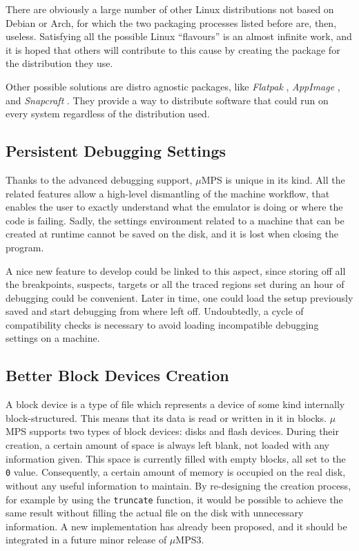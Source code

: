 \documentclass[12pt,a4paper,openright,twoside]{report}
\begin{document}
There are obviously a large number of other Linux distributions not based on Debian or Arch, for which the two packaging processes listed before are, then, useless.
Satisfying all the possible Linux ``flavours'' is an almost infinite work, and it is hoped that others will contribute to this cause by creating the package for the distribution they use.

Other possible solutions are distro agnostic packages, like \textit{Flatpak} \cite{flatpak}, \textit{AppImage} \cite{appimage}, and \textit{Snapcraft} \cite{snapcraft}.
They provide a way to distribute software that could run on every system regardless of the distribution used.

\subsection{Persistent Debugging Settings}
Thanks to the advanced debugging support, $\mu$MPS is unique in its kind.
All the related features allow a high-level dismantling of the machine workflow, that enables the user to exactly understand what the emulator is doing or where the code is failing.
Sadly, the settings environment related to a machine that can be created at runtime cannot be saved on the disk, and it is lost when closing the program.

A nice new feature to develop could be linked to this aspect, since storing off all the breakpoints, suspects, targets or all the traced regions set during an hour of debugging could be convenient.
Later in time, one could load the setup previously saved and start debugging from where left off.
Undoubtedly, a cycle of compatibility checks is necessary to avoid loading incompatible debugging settings on a machine.

\subsection{Better Block Devices Creation}
A block device is a type of file which represents a device of some kind internally block-structured.
This means that its data is read or written in it in blocks.
$\mu$MPS supports two types of block devices: disks and flash devices.
During their creation, a certain amount of space is always left blank, not loaded with any information given.
This space is currently filled with empty blocks, all set to the \texttt{0} value.
Consequently, a certain amount of memory is occupied on the real disk, without any useful information to maintain.
By re-designing the creation process, for example by using the \texttt{truncate} function, it would be possible to achieve the same result without filling the actual file on the disk with unnecessary information.
A new implementation has already been proposed, and it should be integrated in a future minor release of $\mu$MPS3.
\end{document}
